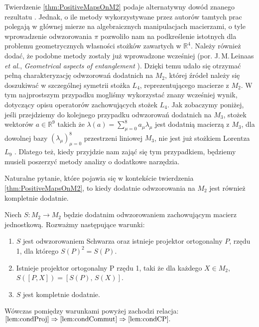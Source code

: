 Twierdzenie \ref{thm:PositiveMapsOnM2} podaje alternatywny dowód
znanego rezultatu \cite{stormer1963positive, woronowicz1976positive}.
Jednak, o ile metody wykorzystywane przez autorów tamtych prac
polegają w głównej mierze na algebraicznych manipulacjach macierzami,
o tyle wprowadzenie odwzorowania $\pi$ pozwoliło nam
na podkreślenie istotnych dla problemu geometrycznych własności stożków
zawartych w  $\mathbb{R}^{4}$.
Należy również dodać, że podobne metody zostały już wprowadzone wcześniej
(por. J.\,M.\,Leinaas \emph{et al.}, \emph{Geometrical aspects of entanglement}
\cite{leinaas2006geometrical}).
Dzięki temu udało się otrzymać pełną charakteryzację odwzorowań dodatnich
na $M_{2}$,
której źródeł należy się doszukiwać w szczególnej symetrii stożka
$L_{4}$, reprezentującego macierze z $M_{2}$.
W tym najprostszym przypadku mogliśmy wykorzystać znany wcześniej
\cite{loewy1975positive} wynik, dotyczący
opisu operatorów zachowujących stożek $L_{4}$.
Jak zobaczymy poniżej, jeśli przejdziemy do kolejnego przypadku
odwzorowań dodatnich na $M_{3}$,
stożek wektorów $a \in \mathbb{R}^{9}$ takich że
$\lambda(a) =  \sum_{\mu=0}^{8} a_{\mu} \lambda_{\mu}$
jest dodatnią macierzą z $M_{3}$,
dla dowolnej bazy $(\lambda_{\mu})_{\mu=0}^{8}$ przestrzeni liniowej $M_{3}$,
nie jest już stożkiem Lorentza $L_{9}$ \cite{goyal2011geometry}.
Dlatego też, kiedy przyjdzie nam zająć się tym przypadkiem,
będziemy musieli poszerzyć metody analizy o dodatkowe narzędzia.


Naturalne pytanie, które pojawia się w kontekście
twierdzenia \ref{thm:PositiveMapsOnM2},
to kiedy dodatnie odwzorowania na $M_{2}$ jest również kompletnie dodatnie.

\begin{Theorem}
\label{thm:MapsPreservingIdentity}
Niech $S: M_{2} \rightarrow M_{2}$ będzie dodatnim odwzorowaniem zachowującym
macierz jednostkową. Rozważmy następujące warunki:
\begin{enumerate}

\item
\label{lem:condProj}
$S$ jest odwzorowaniem Schwarza oraz istnieje projektor ortogonalny $P$, rzędu 1, dla którego $S(P)^{2} = S(P)$.

\item
\label{lem:condCommut}
Istnieje projektor ortogonalny P rzędu 1, taki że dla każdego $X \in M_{2}$,
$S([P,X]) = [S(P), \, S(X)]$.

\item
\label{lem:condCP}
$S$ jest kompletnie dodatnie.
\end{enumerate}
Wówczas pomiędzy warunkami powyżej zachodzi relacja:
$
\ref{lem:condProj} \Rightarrow
    \ref{lem:condCommut} \Rightarrow \ref{lem:condCP}.
$
\end{Theorem}

